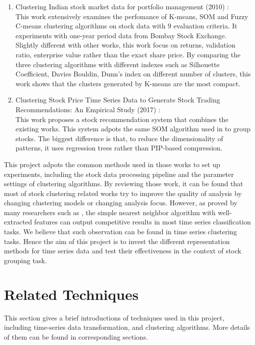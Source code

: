 \begin{enumerate}
    \item Clustering Indian stock market data for portfolio management (2010) \cite{nanda2010clustering}: \\
    This work extensively examines the perfomance of K-means, SOM and Fuzzy C-means clustering algorithms on stock data with 9 evaluation criteria. It experiments with one-year period data from Bombay Stock Exchange. Slightly different with other works, this work focus on returns, validation ratio, enterprise value rather than the exact share price. By comparing the three clustering algorithms with different indexes such as Silhouette Coefficient, Davies Bouldin, Dunn's index on different number of clusters, this work shows that the clusters generated by K-means are the most compact. 
    \item Clustering Stock Price Time Series Data to Generate Stock Trading Recommendations: An Empirical Study (2017) \cite{nair2017clustering}:\\
    This work proposes a stock recommendation system that combines the existing works. This system adpots the same SOM algorithm used in \cite{fu2001pattern} to group stocks. The biggest difference is that, to reduce the dimensionality of patterns, it uses regression trees rather than PIP-based compression. 
\end{enumerate}
This project adpots the common methods used in those works to set up experiments, including the stock data processing pipeline and the parameter settings of clustering algorithms. By reviewing those work, it can be found that most of stock clustering related works try to improve the quality of analysis by changing clustering models or changing analysis focus. However, as proved by many researchers such as \cite{ye2009time,wang2013experimental}, the simple nearest neighbor algorithm with well-extracted features can output competitive results in most time series classification tasks. We believe that such observation can be found in time series clustering tasks. Hence the aim of this project is to invest the different representation methods for time series data and test their effectiveness in the context of stock grouping task.

\section{Related Techniques}
This section gives a brief introductions of techniques used in this project, including time-series data transformation, and clustering algorithms. More details of them can be found in corresponding sections.

